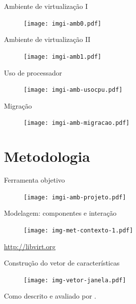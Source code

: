\documentclass{beamer}
\begin{document}
\begin{frame}{Ambiente de virtualização I}
\begin{figure}
\centering
\texttt{[image: imgi-amb0.pdf]}
\end{figure}
\end{frame}

\begin{frame}{Ambiente de virtualização II}
\begin{figure}
\texttt{[image: imgi-amb1.pdf]}
\end{figure}
\end{frame}

\begin{frame}{Uso de processador}
\begin{figure}
\centering
\texttt{[image: imgi-amb-usocpu.pdf]}
\end{figure}
\end{frame}

\begin{frame}{Migração}
\begin{figure}
\centering
\texttt{[image: imgi-amb-migracao.pdf]}
\end{figure}
\end{frame}

\section{Metodologia}

\begin{frame}{Ferramenta objetivo}
\begin{figure}
\centering
\texttt{[image: imgi-amb-projeto.pdf]}
\end{figure}
\end{frame}

\begin{frame}{Modelagem: componentes e interação}
\begin{figure}
\centering
\texttt{[image: img-met-contexto-1.pdf]}
\end{figure}
\tiny{\url{http://libvirt.org}}
\end{frame}

\begin{frame}{Construção do vetor de características}
\begin{figure}
\centering
\texttt{[image: img-vetor-janela.pdf]}
\end{figure}
\tiny{Como descrito e avaliado por \cite{frank2001time}.}
\end{frame}
\end{document}
